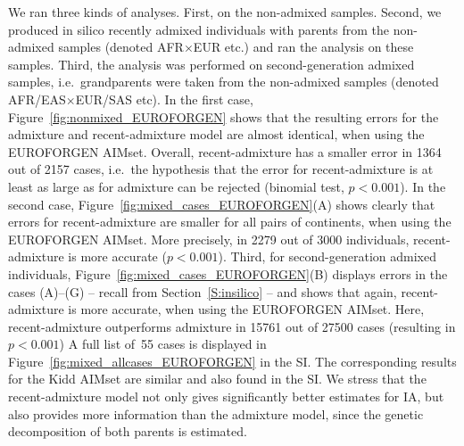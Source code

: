 \documentclass[12pt]{article}
\theoremstyle{definition}
\begin{document}
We ran three kinds of analyses. First, on the non-admixed samples. Second, we produced in silico recently admixed individuals with parents from the non-admixed samples (denoted AFR$\times$EUR etc.) and ran the analysis on these samples. Third, the analysis was performed on second-generation admixed samples, i.e.\ grandparents were taken from the non-admixed samples (denoted AFR/EAS$\times$EUR/SAS etc). In the first case, Figure~\ref{fig:nonmixed_EUROFORGEN} shows that the resulting errors for the admixture and recent-admixture model are almost identical, when using the EUROFORGEN AIMset. Overall, recent-admixture has a smaller error in 1364 out of 2157 cases, i.e.\ the hypothesis that the error for recent-admixture is at least as large as for admixture can be rejected (binomial test, $p<0.001$). %
In the second case, Figure~\ref{fig:mixed_cases_EUROFORGEN}(A) shows clearly that errors for recent-admixture are smaller for all pairs of continents, when using the EUROFORGEN AIMset. More precisely, in 2279 out of 3000 individuals, recent-admixture is more accurate ($p<0.001$). %
Third, for second-generation admixed individuals, Figure~\ref{fig:mixed_cases_EUROFORGEN}(B) displays errors in the cases (A)--(G) -- recall from Section~\ref{S:insilico} -- and shows that again, recent-admixture is more accurate, when using the EUROFORGEN AIMset. Here, recent-admixture outperforms admixture in 15761 out of 27500 cases (resulting in $p<0.001$) %
A full list of~55 cases is displayed in Figure~\ref{fig:mixed_allcases_EUROFORGEN} in the SI. The corresponding results for the Kidd AIMset are similar and also found in the SI. We stress that the recent-admixture model not only gives significantly better estimates for IA, but also provides more information than the admixture model, since the genetic decomposition of both parents is estimated.
\end{document}
